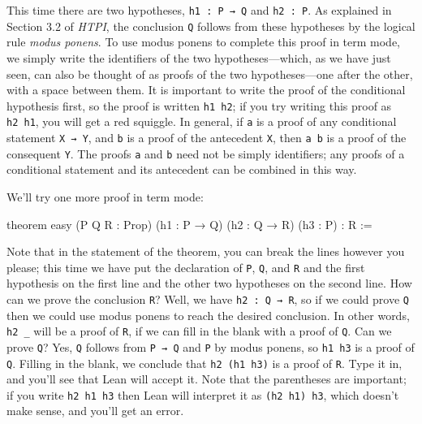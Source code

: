 \documentclass[
  letterpaper,
  DIV=11,
  numbers=noendperiod]{scrreprt}
\newenvironment{Shaded}{\begin{snugshade}}{\end{snugshade}}
\newcommand{\KeywordTok}[1]{\textcolor[rgb]{0.00,0.23,0.31}{#1}}
\newcommand{\NormalTok}[1]{\textcolor[rgb]{0.00,0.23,0.31}{#1}}
\renewcommand{\NormalTok}[1]{\textcolor[HTML]{000000}{#1}}
\renewcommand{\KeywordTok}[1]{\textcolor[HTML]{0000FF}{#1}}
\begin{document}
This time there are two hypotheses, \texttt{h1\ :\ P\ →\ Q} and
\texttt{h2\ :\ P}. As explained in Section 3.2 of \emph{HTPI}, the
conclusion \texttt{Q} follows from these hypotheses by the logical rule
\emph{modus ponens}. To use modus ponens to complete this proof in term
mode, we simply write the identifiers of the two hypotheses---which, as
we have just seen, can also be thought of as proofs of the two
hypotheses---one after the other, with a space between them. It is
important to write the proof of the conditional hypothesis first, so the
proof is written \texttt{h1\ h2}; if you try writing this proof as
\texttt{h2\ h1}, you will get a red squiggle. In general, if \texttt{a}
is a proof of any conditional statement \texttt{X\ →\ Y}, and \texttt{b}
is a proof of the antecedent \texttt{X}, then \texttt{a\ b} is a proof
of the consequent \texttt{Y}. The proofs \texttt{a} and \texttt{b} need
not be simply identifiers; any proofs of a conditional statement and its
antecedent can be combined in this way.

We'll try one more proof in term mode:

\begin{Shaded}
\begin{Highlighting}[]
\KeywordTok{theorem}\NormalTok{ easy (P Q R : }\KeywordTok{Prop}\NormalTok{) (h1 : P → Q)}
\NormalTok{(h2 : Q → R) (h3 : P) : R :=}
\end{Highlighting}
\end{Shaded}

Note that in the statement of the theorem, you can break the lines
however you please; this time we have put the declaration of \texttt{P},
\texttt{Q}, and \texttt{R} and the first hypothesis on the first line
and the other two hypotheses on the second line. How can we prove the
conclusion \texttt{R}? Well, we have \texttt{h2\ :\ Q\ →\ R}, so if we
could prove \texttt{Q} then we could use modus ponens to reach the
desired conclusion. In other words, \texttt{h2\ \_} will be a proof of
\texttt{R}, if we can fill in the blank with a proof of \texttt{Q}. Can
we prove \texttt{Q}? Yes, \texttt{Q} follows from \texttt{P\ →\ Q} and
\texttt{P} by modus ponens, so \texttt{h1\ h3} is a proof of \texttt{Q}.
Filling in the blank, we conclude that \texttt{h2\ (h1\ h3)} is a proof
of \texttt{R}. Type it in, and you'll see that Lean will accept it. Note
that the parentheses are important; if you write \texttt{h2\ h1\ h3}
then Lean will interpret it as \texttt{(h2\ h1)\ h3}, which doesn't make
sense, and you'll get an error.
\end{document}
